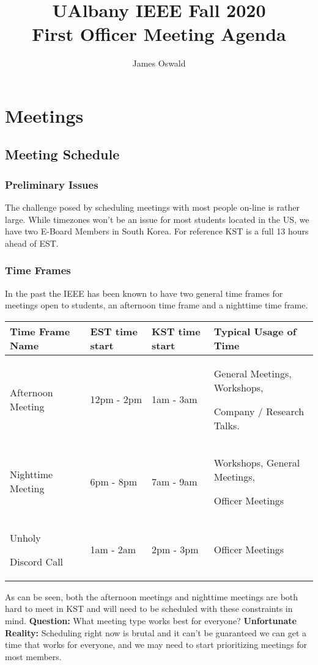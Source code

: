 \documentclass{article}
\author{James Oswald}
\title{UAlbany IEEE Fall 2020 \\ First Officer Meeting Agenda}
\begin{document}
\maketitle
\thispagestyle{fancy}
\section{Meetings}
\subsection{Meeting Schedule}
\subsubsection{Preliminary Issues}
The challenge posed by scheduling meetings with most people on-line is rather large.
While timezones won't be an issue for most students located in the US, we have two E-Board Members
in South Korea. For reference KST is a full 13 hours ahead of EST.

\subsubsection{Time Frames}
In the past the IEEE has been known to have two general time frames for meetings open to students, an afternoon time frame and a nighttime time frame. 
\begin{table}[H]
\begin{tabular}{| m{2.3cm} | m{2.2cm} | m{2.2cm} | m{6cm} |}
\hline
\textbf{Time Frame Name} & \textbf{EST time start} & \textbf{KST time start} & \textbf{Typical Usage of Time} \\
\hline
Afternoon Meeting & 12pm - 2pm & 1am - 3am & General Meetings, Workshops, \par Company / Research Talks. \\
\hline
Nighttime Meeting & 6pm - 8pm & 7am - 9am & Workshops, General Meetings, \par Officer Meetings\\
\hline
Unholy \par Discord Call & 1am - 2am & 2pm - 3pm & Officer Meetings\\
\hline
\end{tabular}
\end{table}
As can be seen, both the afternoon meetings and nighttime meetings are both hard to meet in KST and will need to be scheduled with these constraints in mind.
\vspace{2mm}\newline
\textbf{Question:} What meeting type works best for everyone?
\vspace{2mm}\newline
\textbf{Unfortunate Reality:} Scheduling right now is brutal and it can't be guaranteed we can get a time that works for everyone, and we may need to start prioritizing meetings for most members.
\end{document}
